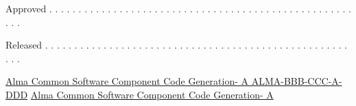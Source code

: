 \documentclass[letterpaper,11pt]{article}
\newcommand\Title{Alma Common Software Component Code Generation}
\newcommand\Version{A}
\newcommand\Document{ALMA-BBB-CCC-A-DDD}
\newcommand\Approved{}
\newcommand\Released{}
\begin{document}
\begin{center}
\footnotesize
\hspace{2.5cm}{Name} \hspace{4cm}{Date}  \hspace{2cm}{Signature}
\vspace{1cm}


\normalsize
{\small {\tt \hspace{-5.5cm}{\Approved}}}     %
\vspace{-0.3cm}

\large
\hspace{-0.7cm} {Approved  \small . . . . . . . . . . . . . . . . . . . . . . . . . . . . . . . . . . . . . . . . . . . . . . . . . . . . . . .}

\footnotesize
\hspace{2.5cm}{Name} \hspace{4cm}{Date} \hspace{2cm}{Signature}
\vspace{1cm}


\normalsize
{\small {\tt \hspace{-5.5cm}{\Released}}}  %
\vspace{-0.3cm}

\large
\hspace{-0.7cm} {Released  \small . . . . . . . . . . . . . . . . . . . . . . . . . . . . . . . . . . . . . . . . . . . . . . . . . . . . . . .}

\footnotesize
\hspace{2.5cm}{Name} \hspace{4cm}{Date} \hspace{2cm}{Signature}
\end{center}

%
\clearpage
\pagestyle{myheadings}
\markboth
{\underline{ \Title - \Version \hspace*{2.5cm} \Document}}   %
{\underline{ \Title - \Version \hspace*{2.5cm} }}   %

\end{document}
